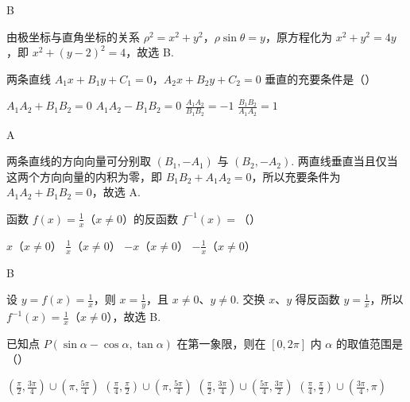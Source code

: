 \documentclass[UTF8,a4paper,oneside,11pt]{ctexbook}
\begin{document}
\begin{answer}
B
\end{answer}

\begin{solution}
由极坐标与直角坐标的关系 \(\rho^{2}=x^{2}+y^{2}\)，\(\rho\sin\theta=y\)，原方程化为
\(x^{2}+y^{2}=4y\)，即 \(x^{2}+(y-2)^{2}=4\)，故选 B.
\end{solution}

\begin{problem}
两条直线 \(A_{1}x + B_{1}y + C_{1} = 0\)，\(A_{2}x + B_{2}y + C_{2} = 0\) 垂直的充要条件是（\quad）

\choices
    {\(A_{1}A_{2} + B_{1}B_{2} = 0\)}
    {\(A_{1}A_{2} - B_{1}B_{2} = 0\)}
    {\(\frac{A_1A_2}{B_1B_2} = -1\)}
    {\(\frac{B_1B_2}{A_1A_2} = 1\)}
\end{problem}

\begin{answer}
A
\end{answer}

\begin{solution}
两条直线的方向向量可分别取 \((B_{1},-A_{1})\) 与 \((B_{2},-A_{2})\). 两直线垂直当且仅当这两个方向向量的内积为零，即
\(B_{1}B_{2}+A_{1}A_{2}=0\)，所以充要条件为 \(A_{1}A_{2}+B_{1}B_{2}=0\)，故选 A.
\end{solution}

\begin{problem}
函数 \(f(x)=\frac{1}{x}\)（\(x\neq 0\)）的反函数 \(f^{-1}(x)=\)（\quad）

\choices
    {\(x\)（\(x\neq 0\)）}
    {\(\frac{1}{x}\)（\(x\neq 0\)）}
    {\(-x\)（\(x\neq 0\)）}
    {\(-\frac{1}{x}\)（\(x\neq 0\)）}
\end{problem}

\begin{answer}
B
\end{answer}

\begin{solution}
设 \(y=f(x)=\frac{1}{x}\)，则 \(x=\frac{1}{y}\)，且 \(x\neq0\)、\(y\neq0\). 交换 \(x\)、\(y\) 得反函数 \(y=\frac{1}{x}\)，所以 \(f^{-1}(x)=\frac{1}{x}\)（\(x\neq0\)），故选 B.
\end{solution}

\begin{problem}
已知点 \(P(\sin \alpha - \cos \alpha, \tan \alpha)\) 在第一象限，则在 \([0, 2\pi]\) 内 \(\alpha\) 的取值范围是（\quad）

\choices
    {\(\left(\frac{\pi}{2}, \frac{3\pi}{4}\right) \cup \left(\pi, \frac{5\pi}{4}\right)\)}
    {\(\left(\frac{\pi}{4}, \frac{\pi}{2}\right) \cup \left(\pi, \frac{5\pi}{4}\right)\)}
    {\(\left(\frac{\pi}{2}, \frac{3\pi}{4}\right) \cup \left(\frac{5\pi}{4}, \frac{3\pi}{2}\right)\)}
    {\(\left(\frac{\pi}{4}, \frac{\pi}{2}\right) \cup \left(\frac{3\pi}{4}, \pi\right)\)}
\end{problem}
\end{document}
